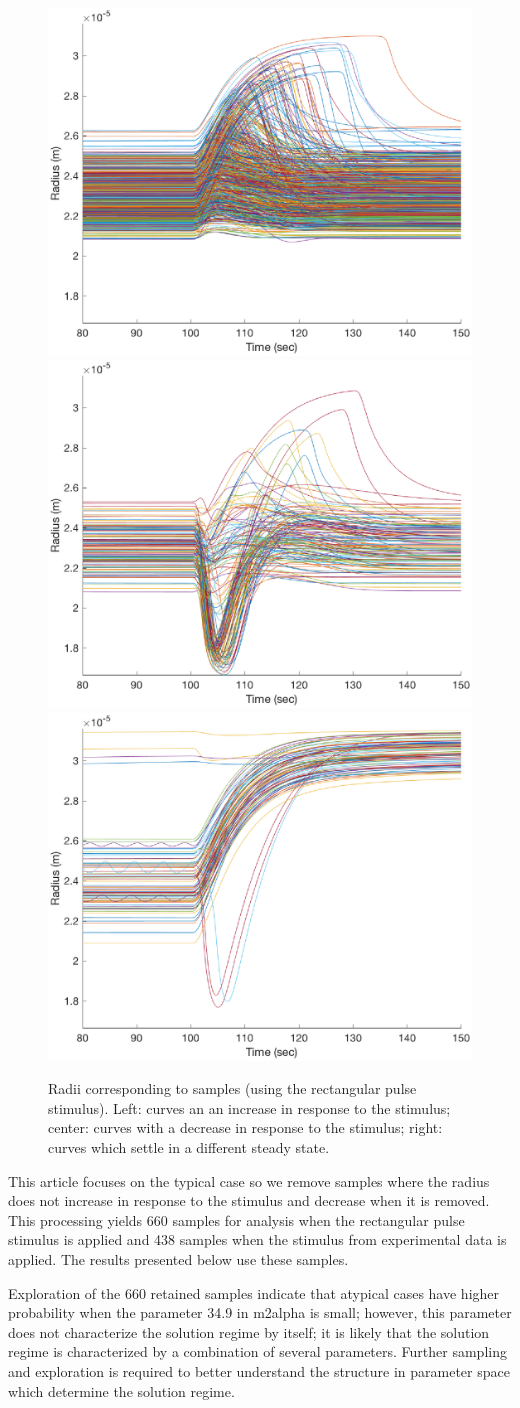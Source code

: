 \documentclass[12pt]{article}
\numberwithin{equation}{section}
\begin{document}
\begin{figure}[h]
\centering
\includegraphics[width=.3 \textwidth]{Figures/Increase_with_Stim_Curves.eps}
\includegraphics[width=.3 \textwidth]{Figures/Decrease_with_Stim_Curves.eps}
\includegraphics[width=.3 \textwidth]{Figures/Higher_Steady_State.eps}
\caption{Radii corresponding to samples (using the rectangular pulse stimulus). Left: curves an an increase in response to the stimulus; center: curves with a decrease in response to the stimulus; right: curves which settle in a different steady state.}
\label{solution_regimes}
\end{figure}

This article focuses on the typical case so we remove samples where the radius does not increase in response to the stimulus and decrease when it is removed. This processing yields 660 samples for analysis when the rectangular pulse stimulus is applied and 438 samples when the stimulus from experimental data is applied. The results presented below use these samples.

Exploration of the 660 retained samples indicate that atypical cases have higher probability when the parameter 34.9 in m2alpha is small; however, this parameter does not characterize the solution regime by itself; it is likely that the solution regime is characterized by a combination of several parameters. Further sampling and exploration is required to better understand the structure in parameter space which determine the solution regime.
\end{document}
